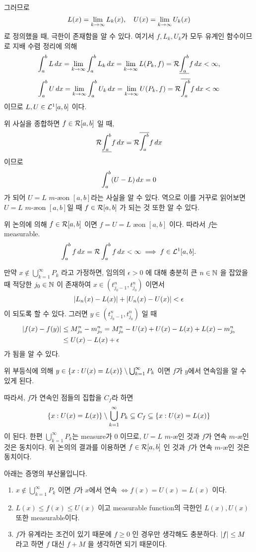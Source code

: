 그러므로
\[
    L(x) = \lim_{k \rightarrow \infty} L_k(x), \quad U(x) = \lim_{k \rightarrow \infty} U_k(x)
\]
로 정의했을 때, 극한이 존재함을 알 수 있다. 여기서 \(f, L_k, U_k\)가 모두 유계인 함수이므로 지배 수렴 정리에 의해
\[
    \int_a^b L \,d{x} = \lim_{k \rightarrow \infty} \int_a^b L_k \,d{x} = \lim_{k \rightarrow\infty} L(P_k, f) = \mathcal{R}\underline{\int_{a}^{b}} f\,d{x} < \infty,
\]
\[
    \int_a^b U\,d{x} = \lim_{k \rightarrow \infty} \int_a^b U_k \,d{x} = \lim_{k \rightarrow\infty} U(P_k, f) = \mathcal{R} \overline{\int_{a}^{b}} f \,d{x} < \infty
\]
이므로 \(L, U \in \mathcal{L}^{1}[a, b]\) 이다.

위 사실을 종합하면 \(f \in \mathcal{R}[a, b]\) 일 때,
\[
    \mathcal{R}\underline{\int_{a}^{b}} f\,d{x} = \mathcal{R}\overline{\int_{a}^{b}} f\,d{x}
\]
이므로
\[
    \int_a^b (U - L)\,d{x} = 0
\]
가 되어 \(U = L\) \(m\)-\ae on \([a, b]\)라는 사실을 알 수 있다. 역으로 이를 거꾸로 읽어보면 \(U = L\) \(m\)-\ae on \([a, b]\)일 때 \(f \in \mathcal{R}[a, b]\) 가 되는 것 또한 알 수 있다.

 위 논의에 의해 \(f \in \mathcal{R}[a, b]\) 이면 \(f = U = L\) \ae on \([a, b]\) 이다. 따라서 \(f\)는 measurable.
\[
    \int_a^b f \,d{x} = \mathcal{R}\int_a^b f\,d{x} < \infty \implies f \in \mathcal{L}^{1}[a, b].
\]

 만약 \(x \notin \bigcup_{k=1}^{\infty} P_k\) 라고 가정하면, 임의의 \(\epsilon > 0\) 에 대해 충분히 큰 \(n \in \mathbb{N}\) 을 잡았을 때 적당한 \(j_0 \in \mathbb{N}\) 이 존재하여 \(x \in (t_{j_0-1}^n, t_{j_0}^n)\) 이면서
\[
    \left| L_n(x) - L(x) \right| + \left| U_n(x) - U(x) \right| < \epsilon
\]
이 되도록 할 수 있다. 그러면 \(y \in (t_{j_0-1}^n, t_{j_0}^n)\) 일 때
\[
    \begin{aligned}
        \left| f(x) - f(y) \right| & \leq M_{j_0}^n - m_{j_0}^n = M_{j_0}^n - U(x) + U(x) - L(x) + L(x) - m_{j_0}^n \\
                          & \leq U(x) - L(x) + \epsilon
    \end{aligned}
\]
가 됨을 알 수 있다.

위 부등식에 의해 \(y \in \{x : U(x) = L(x)\} \setminus \bigcup_{k=1}^{\infty} P_k\) 이면 \(f\)가 \(y\)에서 연속임을 알 수 있게 된다.

따라서, \(f\)가 연속인 점들의 집합을 \(C_f\)라 하면
\[
    \{x : U(x) = L(x)\} \setminus \bigcup_{k=1}^{\infty} P_k \subseteq C_f \subseteq \{x : U(x) = L(x)\}
\]
이 된다. 한편 \(\bigcup_{k=1}^{\infty} P_k\)는 measure가 0 이므로, \(U = L\) \(m\)-\ae 인 것과 \(f\)가 연속 \(m\)-\ae 인 것은 동치이다. 위 논의의 결과를 이용하면 \(f \in \mathcal{R}[a, b]\) 인 것과 \(f\)가 연속 \(m\)-\ae 인 것은 동치이다.

아래는 증명의 부산물입니다.

\rmk
\begin{enumerate}
    \item \(x \notin \bigcup_{k=1}^\infty P_k\) 이면 \(f\)가 \(x\)에서 연속 \(\iff f(x) = U(x) = L(x)\) 이다.
    \item \(L(x) \leq f(x) \leq U(x)\) 이고 measurable function의 극한인 \(L(x), U(x)\) 또한 measurable이다.
    \item \(f\)가 유계라는 조건이 있기 때문에 \(f \geq 0\) 인 경우만 생각해도 충분하다. \(\left| f \right| \leq M\) 라고 하면 \(f\) 대신 \(f + M\) 을 생각하면 되기 때문이다.
\end{enumerate}


